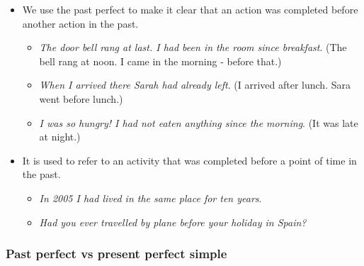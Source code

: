 \begin{itemize}

\item We use the past perfect to make it clear that an action was completed before another action in the past.

\begin{itemize}
\item \textit{The door bell rang at last. I had been in the room since breakfast}. (The bell rang at noon. I came in the morning - before that.) 
\item \textit{When I arrived there Sarah had already left}. (I arrived after lunch. Sara went before lunch.)
\item \textit{I was so hungry! I had not eaten anything since the morning}. (It was late at night.)
\end{itemize}

\item It is used to refer to an activity that was completed before a point of time in the past.

\begin{itemize}
\item \textit{In 2005 I had lived in the same place for ten years}.
\item \textit{Had you ever travelled by plane before your holiday in Spain?}
\end{itemize}

\end{itemize}

\subsubsection{Past perfect vs present perfect simple}

